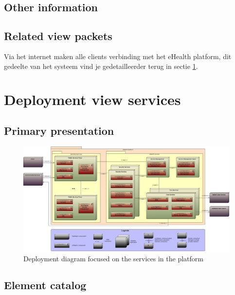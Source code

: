 \documentclass[a4paper,10pt]{article}
\begin{document}
\subsection{Other information}

\subsection{Related view packets}
Via het internet maken alle clients verbinding met het eHealth platform, dit gedeelte van het systeem vind je gedetailleerder terug in sectie \ref{sec:deployment_services}.

\clearpage
\section{Deployment view services}
\label{sec:deployment_services}

\subsection{Primary presentation}
\begin{center}
    \begin{figure}[!h]
      \includegraphics[width=\textwidth]{../images/deployment_services.jpg}
	\caption{Deployment diagram focused on the services in the platform}
    \end{figure}
  \end{center}

\subsection{Element catalog}
\end{document}
